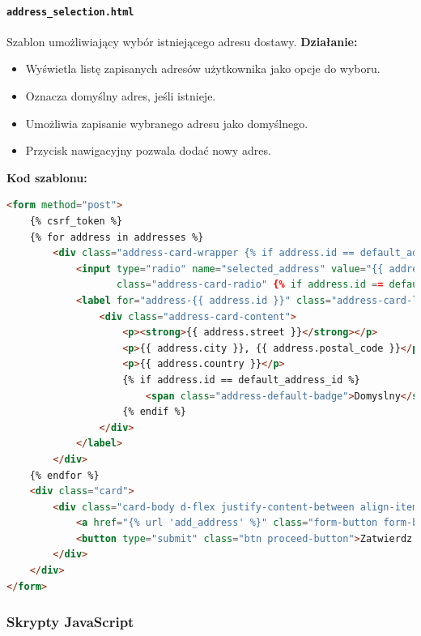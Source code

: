 \documentclass[12pt,a4paper,oneside]{article}
\theoremstyle{definition}
\numberwithin{equation}{section}
\begin{document}
\paragraph{\texttt{address\_selection.html}}
\label{sec:address_selection_template}
Szablon umożliwiający wybór istniejącego adresu dostawy.  
\textbf{Działanie:}
\begin{itemize}
    \item Wyświetla listę zapisanych adresów użytkownika jako opcje do wyboru.
    \item Oznacza domyślny adres, jeśli istnieje.
    \item Umożliwia zapisanie wybranego adresu jako domyślnego.
    \item Przycisk nawigacyjny pozwala dodać nowy adres.
\end{itemize}
\textbf{Kod szablonu:}
\begin{lstlisting}[language=HTML, caption=Szablon address\_selection.html]
<form method="post">
    {% csrf_token %}
    {% for address in addresses %}
        <div class="address-card-wrapper {% if address.id == default_address_id %}address-default{% endif %}">
            <input type="radio" name="selected_address" value="{{ address.id }}" id="address-{{ address.id }}"
                   class="address-card-radio" {% if address.id == default_address_id %}checked{% endif %}>
            <label for="address-{{ address.id }}" class="address-card-label">
                <div class="address-card-content">
                    <p><strong>{{ address.street }}</strong></p>
                    <p>{{ address.city }}, {{ address.postal_code }}</p>
                    <p>{{ address.country }}</p>
                    {% if address.id == default_address_id %}
                        <span class="address-default-badge">Domyslny</span>
                    {% endif %}
                </div>
            </label>
        </div>
    {% endfor %}
    <div class="card">
        <div class="card-body d-flex justify-content-between align-items-center">
            <a href="{% url 'add_address' %}" class="form-button form-button-secondary">Dodaj nowy adres</a>
            <button type="submit" class="btn proceed-button">Zatwierdz adres</button>
        </div>
    </div>
</form>
\end{lstlisting}





\subsubsection*{Skrypty JavaScript}
\end{document}
